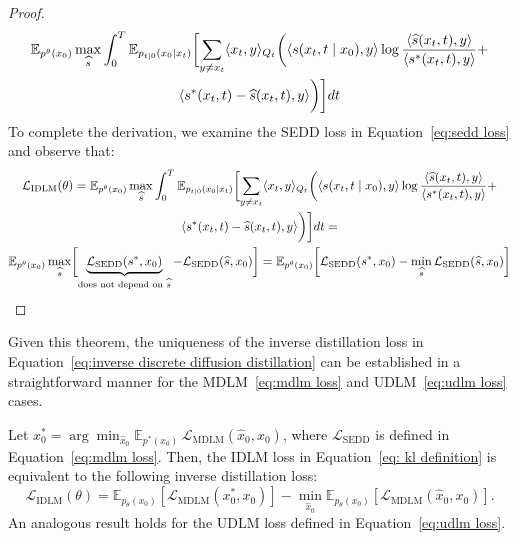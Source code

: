 \begin{proof}
\begin{gather}
                 \mathbb{E}_{p^{\theta}(x_0)} \max_{\widehat{s}}\int_0^T \mathbb{E}_{p_{t \mid 0}(x_0 \mid x_t)}  \biggl[ \sum_{y \neq x_t} \langle x_t, y\rangle_{Q_t} \biggl(\langle s(x_t, t\mid x_0), y \rangle \log \frac{\langle \widehat{s}(x_t,t), y\rangle}{\langle s^{*}(x_t,t), y\rangle} + \nonumber \\
                  \langle s^{*}(x_t,t) - \widehat{s}(x_t,t), y\rangle\biggr)\biggr]dt
                 \nonumber
            \end{gather}
            To complete the derivation, we examine the SEDD loss in Equation~\eqref{eq:sedd loss} and observe that:
            \begin{gather}
                \mathcal{L}_{\text{IDLM}}(\theta) = \mathbb{E}_{p^{\theta}(x_0)} \max_{\widehat{s}}\int_0^T \mathbb{E}_{p_{t \mid 0}(x_0 \mid x_t)}  \biggl[\sum_{y \neq x_t} \langle x_t, y\rangle_{Q_t} \biggl(\langle s(x_t, t\mid x_0), y \rangle \log \frac{\langle \widehat{s}(x_t,t), y\rangle}{\langle s^{*}(x_t,t), y\rangle} + \nonumber \\
                  \langle s^{*}(x_t,t) - \widehat{s}(x_t,t), y\rangle\biggr)\biggr]dt =
                  \nonumber \\
                  \mathbb{E}_{p^{\theta}(x_0)} \max_{\widehat{s}}\biggl[\underbrace{\mathcal{L}_{\text{SEDD}}(s^*, x_0)}_{\text{does not depend on } \widehat{s}} - \mathcal{L}_{\text{SEDD}}(\widehat{s}, x_0) \biggr] = \mathbb{E}_{p^{\theta}(x_0)} \biggl[\mathcal{L}_{\text{SEDD}}(s^*, x_0) - \min_{\widehat{s}} \mathcal{L}_{\text{SEDD}}(\widehat{s}, x_0)\biggr] \nonumber
            \end{gather}
        \end{proof}
        Given this theorem, the uniqueness of the inverse distillation loss in Equation~\eqref{eq:inverse discrete diffusion distillation} can be established in a straightforward manner for the MDLM~\eqref{eq:mdlm loss} and UDLM~\eqref{eq:udlm loss} cases.
        \begin{proposition}
            Let $x_0^* = \arg\min_{\widehat{x}_0} \mathbb{E}_{p^*(x_0)} \, \mathcal{L}_{\text{MDLM}}(\widehat{x}_0, x_0)$, where $\mathcal{L}_{\text{SEDD}}$ is defined in Equation~\eqref{eq:mdlm loss}. Then, the IDLM loss in Equation~\eqref{eq: kl definition} is equivalent to the following inverse distillation loss:
            $$
            \mathcal{L}_{\text{IDLM}}(\theta) =
            \mathbb{E}_{ p_{\theta}(x_0)} \left[\mathcal{L}_{\text{MDLM}}(x_0^*, x_0)\right]
            - \min_{\widehat{x}_0} \mathbb{E}_{ p_{\theta}(x_0)} \left[\mathcal{L}_{\text{MDLM}}(\widehat{x}_0, x_0)\right].
            $$                
            An analogous result holds for the UDLM loss defined in Equation~\eqref{eq:udlm loss}.
        \end{proposition}
